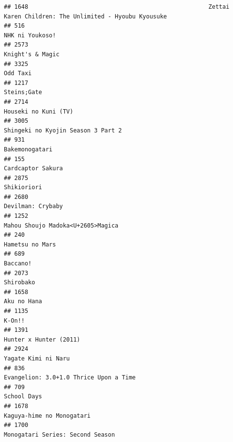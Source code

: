 \documentclass[
]{article}
\begin{document}
\begin{verbatim}
## 1648                                                    Zettai Karen Children: The Unlimited - Hyoubu Kyousuke
## 516                                                                                            NHK ni Youkoso!
## 2573                                                                                          Knight's & Magic
## 3325                                                                                                  Odd Taxi
## 1217                                                                                               Steins;Gate
## 2714                                                                                      Houseki no Kuni (TV)
## 3005                                                                        Shingeki no Kyojin Season 3 Part 2
## 931                                                                                             Bakemonogatari
## 155                                                                                          Cardcaptor Sakura
## 2875                                                                                               Shikioriori
## 2680                                                                                         Devilman: Crybaby
## 1252                                                                         Mahou Shoujo Madoka<U+2605>Magica
## 240                                                                                            Hametsu no Mars
## 689                                                                                                   Baccano!
## 2073                                                                                                 Shirobako
## 1658                                                                                               Aku no Hana
## 1135                                                                                                    K-On!!
## 1391                                                                                    Hunter x Hunter (2011)
## 2924                                                                                       Yagate Kimi ni Naru
## 836                                                                     Evangelion: 3.0+1.0 Thrice Upon a Time
## 709                                                                                                School Days
## 1678                                                                                 Kaguya-hime no Monogatari
## 1700                                                                          Monogatari Series: Second Season

\end{verbatim}
\end{document}
